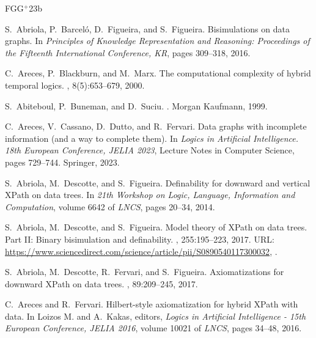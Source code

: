 \documentclass[10pt,a4paper]{amsart}
\theoremstyle{definition}
\theoremstyle{remark}
\begin{document}
\newcommand{\etalchar}[1]{$^{#1}$}
\begin{thebibliography}{FGG{\etalchar{+}}23b}

S.~Abriola, P.~Barcel{\'{o}}, D.~Figueira, and S.~Figueira.
\newblock Bisimulations on data graphs.
\newblock In {\em Principles of Knowledge Representation and Reasoning: Proceedings of the Fifteenth International Conference, {KR}}, pages 309--318, 2016.

C.~Areces, P.~Blackburn, and M.~Marx.
\newblock The computational complexity of hybrid temporal logics.
, 8(5):653--679, 2000.

S.~Abiteboul, P.~Buneman, and D.~Suciu.
.
\newblock Morgan Kaufmann, 1999.

C.~Areces, V.~Cassano, D.~Dutto, and R.~Fervari.
\newblock Data graphs with incomplete information (and a way to complete them).
\newblock In {\em Logics in Artificial Intelligence. 18th European Conference, JELIA 2023}, Lecture Notes in Computer Science, pages 729--744. Springer, 2023.

S.~Abriola, M.~Descotte, and S.~Figueira.
\newblock Definability for downward and vertical {{XP}ath} on data trees.
\newblock In {\em 21th Workshop on Logic, Language, Information and Computation}, volume 6642 of {\em LNCS}, pages 20--34, 2014.

S.~Abriola, M.~Descotte, and S.~Figueira.
\newblock Model theory of {XPath} on data trees. {P}art {II}: Binary bisimulation and definability.
, 255:195--223, 2017.
\newblock URL: \url{https://www.sciencedirect.com/science/article/pii/S0890540117300032}, \href {https://doi.org/10.1016/j.ic.2017.01.002} {}.

S.~Abriola, M.~Descotte, R.~Fervari, and S.~Figueira.
\newblock Axiomatizations for downward {XP}ath on data trees.
, 89:209--245, 2017.

C.~Areces and R.~Fervari.
\newblock Hilbert-style axiomatization for hybrid {XP}ath with data.
\newblock In Loizos M. and A.~Kakas, editors, {\em Logics in Artificial Intelligence - 15th European Conference, {JELIA} 2016}, volume 10021 of {\em LNCS}, pages 34--48, 2016.


\end{thebibliography}
\end{document}
